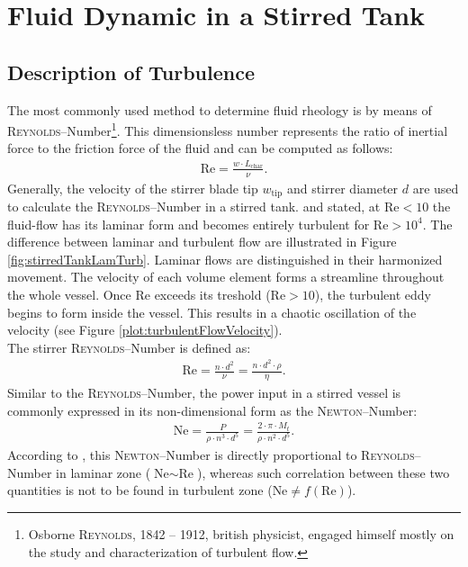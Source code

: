 \section{Fluid Dynamic in a Stirred Tank}

\subsection{Description of Turbulence}
The most commonly used method to determine fluid rheology is by means of \textsc{Reynolds}--Number\footnote{Osborne \textsc{Reynolds}, 1842 -- 1912, british physicist, engaged himself mostly on the study and characterization of turbulent flow.}. This dimensionsless number represents the ratio of inertial force to the friction force of the fluid and can be computed as follows:
\begin{align} \label{eq:reynoldGeneral}
    \text{Re} = \frac{w \cdot L_{\text{char}}}{\nu}.
\end{align}
Generally, the velocity of the stirrer blade tip $w_{\text{tip}}$ and stirrer diameter $d$ are used to calculate the \textsc{Reynolds}--Number in a stirred tank. \citet{Kraume2012} and \citet{Wollny2010Diss} stated, at $\text{Re} < 10$ the fluid-flow has its laminar form and becomes entirely turbulent for $\text{Re} > 10^4$. The difference between laminar and turbulent flow are illustrated in Figure \ref{fig:stirredTankLamTurb}. Laminar flows are distinguished in their harmonized movement. The velocity of each volume element forms a streamline throughout the whole vessel. Once Re exceeds its treshold ($\text{Re} > 10$), the turbulent eddy begins to form inside the vessel. This results in a chaotic oscillation of the velocity (see Figure \ref{plot:turbulentFlowVelocity}).
\\
The stirrer \textsc{Reynolds}--Number is defined as:
\begin{gather}
    \text{Re} = \frac{n \cdot d^2}{\nu} = \frac{n \cdot d^2 \cdot \rho}{\eta}.
\end{gather}
Similar to the \textsc{Reynolds}--Number, the power input in a stirred vessel is commonly expressed in its non-dimensional form as the \textsc{Newton}--Number:
\begin{gather}
    \text{Ne} = \frac{P}{\rho \cdot n^3 \cdot d^5} = \frac{2 \cdot \pi \cdot M_t}{\rho \cdot n^2 \cdot d^5}.
\end{gather}
According to \citet{Wollny2010Diss}, this \textsc{Newton}--Number is directly proportional to \textsc{Reynolds}--Number in laminar zone ($\text{Ne} \sim \text{Re}$), whereas such correlation between these two quantities is not to be found in turbulent zone ($\text{Ne} \neq f(\text{Re})$). 

